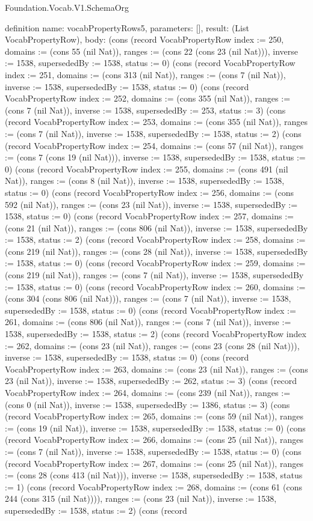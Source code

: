 \begin{lexlean}{Foundation.Vocab.V1.SchemaOrg}
\begin{semanticmodule}
definition{
  name: vocabPropertyRows5,
  parameters: [],
  result: (List VocabPropertyRow),
  body: (cons (record VocabPropertyRow {index := 250, domains := (cons 55 (nil Nat)), ranges := (cons 22 (cons 23 (nil Nat))), inverse := 1538, supersededBy := 1538, status := 0}) (cons (record VocabPropertyRow {index := 251, domains := (cons 313 (nil Nat)), ranges := (cons 7 (nil Nat)), inverse := 1538, supersededBy := 1538, status := 0}) (cons (record VocabPropertyRow {index := 252, domains := (cons 355 (nil Nat)), ranges := (cons 7 (nil Nat)), inverse := 1538, supersededBy := 253, status := 3}) (cons (record VocabPropertyRow {index := 253, domains := (cons 355 (nil Nat)), ranges := (cons 7 (nil Nat)), inverse := 1538, supersededBy := 1538, status := 2}) (cons (record VocabPropertyRow {index := 254, domains := (cons 57 (nil Nat)), ranges := (cons 7 (cons 19 (nil Nat))), inverse := 1538, supersededBy := 1538, status := 0}) (cons (record VocabPropertyRow {index := 255, domains := (cons 491 (nil Nat)), ranges := (cons 8 (nil Nat)), inverse := 1538, supersededBy := 1538, status := 0}) (cons (record VocabPropertyRow {index := 256, domains := (cons 592 (nil Nat)), ranges := (cons 23 (nil Nat)), inverse := 1538, supersededBy := 1538, status := 0}) (cons (record VocabPropertyRow {index := 257, domains := (cons 21 (nil Nat)), ranges := (cons 806 (nil Nat)), inverse := 1538, supersededBy := 1538, status := 2}) (cons (record VocabPropertyRow {index := 258, domains := (cons 219 (nil Nat)), ranges := (cons 28 (nil Nat)), inverse := 1538, supersededBy := 1538, status := 0}) (cons (record VocabPropertyRow {index := 259, domains := (cons 219 (nil Nat)), ranges := (cons 7 (nil Nat)), inverse := 1538, supersededBy := 1538, status := 0}) (cons (record VocabPropertyRow {index := 260, domains := (cons 304 (cons 806 (nil Nat))), ranges := (cons 7 (nil Nat)), inverse := 1538, supersededBy := 1538, status := 0}) (cons (record VocabPropertyRow {index := 261, domains := (cons 806 (nil Nat)), ranges := (cons 7 (nil Nat)), inverse := 1538, supersededBy := 1538, status := 2}) (cons (record VocabPropertyRow {index := 262, domains := (cons 23 (nil Nat)), ranges := (cons 23 (cons 28 (nil Nat))), inverse := 1538, supersededBy := 1538, status := 0}) (cons (record VocabPropertyRow {index := 263, domains := (cons 23 (nil Nat)), ranges := (cons 23 (nil Nat)), inverse := 1538, supersededBy := 262, status := 3}) (cons (record VocabPropertyRow {index := 264, domains := (cons 239 (nil Nat)), ranges := (cons 0 (nil Nat)), inverse := 1538, supersededBy := 1386, status := 3}) (cons (record VocabPropertyRow {index := 265, domains := (cons 59 (nil Nat)), ranges := (cons 19 (nil Nat)), inverse := 1538, supersededBy := 1538, status := 0}) (cons (record VocabPropertyRow {index := 266, domains := (cons 25 (nil Nat)), ranges := (cons 7 (nil Nat)), inverse := 1538, supersededBy := 1538, status := 0}) (cons (record VocabPropertyRow {index := 267, domains := (cons 25 (nil Nat)), ranges := (cons 28 (cons 413 (nil Nat))), inverse := 1538, supersededBy := 1538, status := 1}) (cons (record VocabPropertyRow {index := 268, domains := (cons 61 (cons 244 (cons 315 (nil Nat)))), ranges := (cons 23 (nil Nat)), inverse := 1538, supersededBy := 1538, status := 2}) (cons (record }
\end{semanticmodule}
\end{lexlean}
